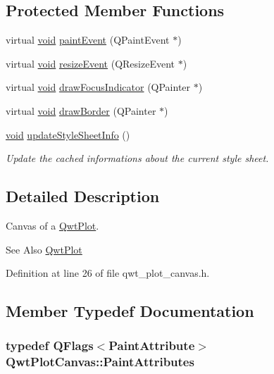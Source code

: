 \subsection*{Protected Member Functions}
\begin{DoxyCompactItemize}
\item 
virtual \hyperlink{group___u_a_v_objects_plugin_ga444cf2ff3f0ecbe028adce838d373f5c}{void} \hyperlink{class_qwt_plot_canvas_aa8f1516817c578efd407d8dd574170ec}{paint\-Event} (Q\-Paint\-Event $\ast$)
\item 
virtual \hyperlink{group___u_a_v_objects_plugin_ga444cf2ff3f0ecbe028adce838d373f5c}{void} \hyperlink{class_qwt_plot_canvas_a1d4a1508bef7b417c3414c345bd60022}{resize\-Event} (Q\-Resize\-Event $\ast$)
\item 
virtual \hyperlink{group___u_a_v_objects_plugin_ga444cf2ff3f0ecbe028adce838d373f5c}{void} \hyperlink{class_qwt_plot_canvas_a4dc526ac5186fe253a158a392bbb4f40}{draw\-Focus\-Indicator} (Q\-Painter $\ast$)
\item 
virtual \hyperlink{group___u_a_v_objects_plugin_ga444cf2ff3f0ecbe028adce838d373f5c}{void} \hyperlink{class_qwt_plot_canvas_a4d415010a4baa09fa3b3edfcc6e5e4e7}{draw\-Border} (Q\-Painter $\ast$)
\item 
\hyperlink{group___u_a_v_objects_plugin_ga444cf2ff3f0ecbe028adce838d373f5c}{void} \hyperlink{class_qwt_plot_canvas_a00cf0a23416a719cb8b742fca074c681}{update\-Style\-Sheet\-Info} ()
\begin{DoxyCompactList}\small\item\em Update the cached informations about the current style sheet. \end{DoxyCompactList}\end{DoxyCompactItemize}


\subsection{Detailed Description}
Canvas of a \hyperlink{class_qwt_plot}{Qwt\-Plot}. 

\begin{DoxySeeAlso}{See Also}
\hyperlink{class_qwt_plot}{Qwt\-Plot} 
\end{DoxySeeAlso}


Definition at line 26 of file qwt\-\_\-plot\-\_\-canvas.\-h.



\subsection{Member Typedef Documentation}
\hypertarget{class_qwt_plot_canvas_ac007a0126efb62443e52905d3157102d}{
\subsubsection[{Paint\-Attributes}]{\setlength{\rightskip}{0pt plus 5cm}typedef Q\-Flags$<${\bf Paint\-Attribute}$>$ {\bf Qwt\-Plot\-Canvas\-::\-Paint\-Attributes}}}\label{class_qwt_plot_canvas_ac007a0126efb62443e52905d3157102d}


